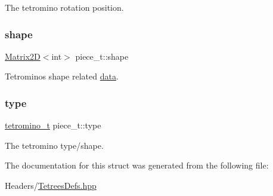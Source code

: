 The tetromino rotation position. \mbox{\label{structpiece__t_a3c8f9c2e51c6bab728e564143c439746}} 
\subsubsection{\texorpdfstring{shape}{shape}}
{\footnotesize\ttfamily \mbox{\hyperlink{classMatrix2D}{Matrix2D}}$<$int$>$ piece\+\_\+t\+::shape}

Tetromino\textquotesingle{}s shape related \mbox{\hyperlink{classTetreesUtils_acb377319f6772d9e88f677273c895912}{data}}. \mbox{\label{structpiece__t_ac5cbbdb5ff335128af8ca9f491a4f543}} 
\subsubsection{\texorpdfstring{type}{type}}
{\footnotesize\ttfamily \mbox{\hyperlink{TetreesDefs_8hpp_acd279a62a49ecee418dd808ac39a1795}{tetromino\+\_\+t}} piece\+\_\+t\+::type}

The tetromino type/shape. 

The documentation for this struct was generated from the following file\+:\begin{DoxyCompactItemize}
\item 
Headers/\mbox{\hyperlink{TetreesDefs_8hpp}{Tetrees\+Defs.\+hpp}}\end{DoxyCompactItemize}
